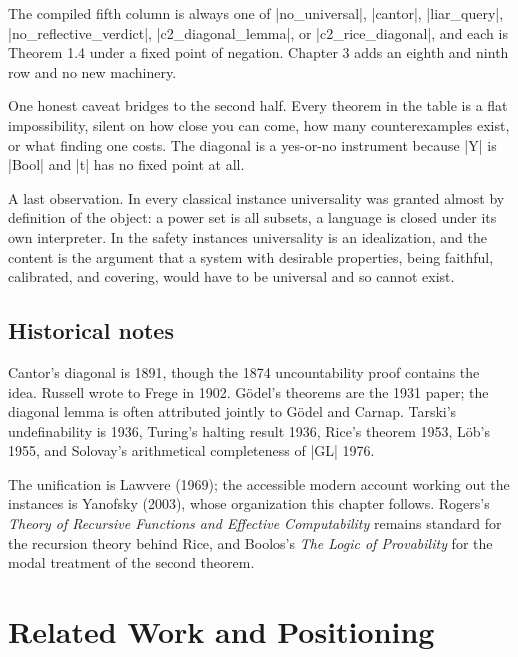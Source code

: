 \documentclass{memoir}
\begin{document}
The compiled fifth column is always one of \LeanVerb|no_universal|, \LeanVerb|cantor|,
\LeanVerb|liar_query|, \LeanVerb|no_reflective_verdict|, \LeanVerb|c2_diagonal_lemma|, or
\LeanVerb|c2_rice_diagonal|, and each is Theorem 1.4 under a fixed point of
negation. Chapter 3 adds an eighth and ninth row and no new machinery.

One honest caveat bridges to the second half. Every theorem in the table is a
flat impossibility, silent on how close you can come, how many counterexamples
exist, or what finding one costs. The diagonal is a yes-or-no instrument because
\LeanVerb|Y| is \LeanVerb|Bool| and \LeanVerb|t| has no fixed point at all.

A last observation. In every classical instance universality was granted almost
by definition of the object: a power set is all subsets, a language is closed
under its own interpreter. In the safety instances universality is an
idealization, and the content is the argument that a system with desirable
properties, being faithful, calibrated, and covering, would have to be universal
and so cannot exist.



\section{Historical notes}\label{Two--Schemas--of--Impossibility-005F-005F-005F--Machine--Checked--Limits--of--Trustworthy--Machine--Learning-005F-005F-005F--and--Why--They--Tighten--with--Capability----The--Classical--Limits----Historical--notes}

Cantor's diagonal is 1891, though the 1874 uncountability proof contains the
idea. Russell wrote to Frege in 1902. Gödel's theorems are the 1931 paper; the
diagonal lemma is often attributed jointly to Gödel and Carnap. Tarski's
undefinability is 1936, Turing's halting result 1936, Rice's theorem 1953, Löb's
1955, and Solovay's arithmetical completeness of \LeanVerb|GL| 1976.

The unification is Lawvere (1969); the accessible modern account working out the
instances is Yanofsky (2003), whose organization this chapter follows. Rogers's
\emph{Theory of Recursive Functions and Effective Computability} remains standard for
the recursion theory behind Rice, and Boolos's \emph{The Logic of Provability} for
the modal treatment of the second theorem.





\chapter{Related Work and Positioning}\label{Two--Schemas--of--Impossibility-005F-005F-005F--Machine--Checked--Limits--of--Trustworthy--Machine--Learning-005F-005F-005F--and--Why--They--Tighten--with--Capability----Related--Work--and--Positioning}
\end{document}
